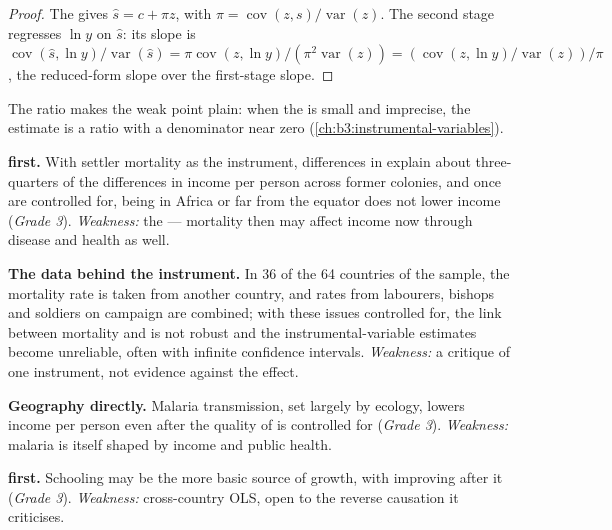 \begin{proof}
The  gives $\hat s = c + \pi z$, with $\pi = \operatorname{cov}(z, s)/\operatorname{var}(z)$. The second stage regresses $\ln y$ on $\hat s$:
its slope is $\operatorname{cov}(\hat s, \ln y)/\operatorname{var}(\hat s) = \pi\operatorname{cov}(z, \ln y)/(\pi^2\operatorname{var}(z)) = (\operatorname{cov}(z, \ln y)/\operatorname{var}(z))/\pi$, the reduced-form slope over the first-stage slope.
\end{proof}

The ratio makes the weak point plain: when the  is small and imprecise,
the estimate is a ratio with a denominator near zero
(\cref{ch:b3:instrumental-variables}).

\begin{debate}
\textbf{ first.} With settler mortality as the instrument, differences in
 explain about three-quarters of the differences in income per person across
former colonies, and once  are controlled for, being in Africa or far
from the equator does not lower income (\emph{Grade 3}). %
\emph{Weakness:} the  --- mortality then may affect income now
through disease and health as well.

\textbf{The data behind the instrument.} In 36 of the 64 countries of the sample, the mortality rate is
taken from another country, and rates from labourers, bishops and soldiers on
campaign are combined; with these issues controlled for, the link between mortality
and  is not robust and the instrumental-variable estimates become
unreliable, often with infinite confidence intervals. %
\emph{Weakness:} a critique of one instrument, not evidence against the effect.

\textbf{Geography directly.} Malaria transmission, set largely by ecology, lowers
income per person even after the quality of  is controlled for (\emph{Grade 3}). %
\emph{Weakness:} malaria is itself shaped by income and public health.

\textbf{ first.} Schooling may be the more basic source of growth,
with  improving after it (\emph{Grade 3}). %
\emph{Weakness:} cross-country OLS, open to the reverse causation it criticises.


\end{debate}
